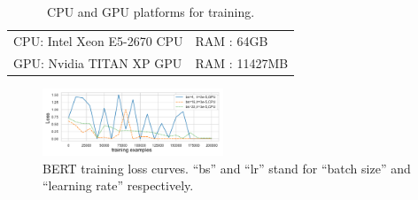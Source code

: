 \begin{table}[t]
\centering
\caption{\textcolor{check}{CPU and GPU platforms for training.}}
\vspace{-7pt}
\begin{tabular}{ll}
\hline
CPU: Intel Xeon E5-2670 CPU & RAM : 64GB\\ %
GPU: Nvidia TITAN XP GPU & RAM : 11427MB\\
\hline
\end{tabular}
\vspace{-5pt}
\label{tab:hw_gpu}
\end{table}

\begin{figure}[!t]
\centering
\includegraphics[width=0.48\textwidth]{figures/bert_curve.pdf}
\vspace{-22pt}
\caption{\textcolor{check}{BERT training loss curves. ``bs'' and ``lr'' stand for ``batch size'' and  ``learning rate'' respectively.}}
\vspace{-3pt}
\label{fig:bert_motivation}
\end{figure}

